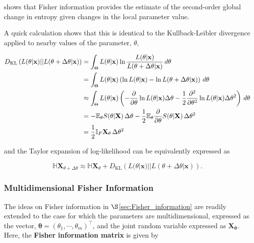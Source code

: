 \documentclass[12pt, twoside, draft]{article}
\begin{document}
shows that Fisher information provides the estimate of the second-order global change in entropy given changes in the local parameter value.

A quick calculation shows that this is identical to the Kullback-Leibler divergence applied to nearby values of the parameter, $\theta$,

\begin{align}
D_{\text{KL}} \left( L(\theta | \mathbf{x}) || L(\theta + \Delta \theta | \mathbf{x}) \right) &= \int_{\Theta}  L(\theta | \mathbf{x}) \ln \frac{L(\theta | \mathbf{x})}{ L(\theta + \Delta \theta | \mathbf{x})}\,d\theta \notag \\
&= \int_{\Theta} L(\theta | \mathbf{x}) \left( \ln L(\theta | \mathbf{x}) - \ln L(\theta + \Delta \theta | \mathbf{x}) \right)\,d\theta \notag \\
&\approx \int_{\Theta} L(\theta | \mathbf{x}) \left( -\frac{\partial}{\partial \theta} \ln L(\theta | \mathbf{x}) \Delta\theta - \frac{1}{2} \frac{\partial^2}{\partial \theta^2} \ln L(\theta | \mathbf{x}) \Delta\theta^2 \right)\,d\theta \notag \\
&= -\mathbb{E}_\theta S(\theta | \mathbf{X})\, \Delta \theta - \frac{1}{2}\mathbb{E}_\theta \frac{\partial}{\partial \theta} S(\theta | \mathbf{X})\, \Delta \theta^2 \notag \\
&= \frac{1}{2} \mathbb{I}_F \mathbf{X}_\theta\, \Delta \theta^2
\end{align}

and the Taylor expansion of log-likelihood can be equivalently expressed as

\begin{equation}
\mathbb{H} \mathbf{X}_{\theta + \Delta \theta} \approx \mathbb{H} \mathbf{X}_\theta + D_{\text{KL}} \left( L(\theta | \mathbf{x}) || L(\theta + \Delta \theta | \mathbf{x}) \right) .
\end{equation}

\subsubsection{Multidimensional Fisher Information}\label{sec:multidimensional_Fisher_information}

The ideas on Fisher information in $\S$\ref{sec:Fisher_information} are readily extended to the case for which the parameters are multidimensional, expressed as the vector, $\boldsymbol{\theta} = (\theta_1, \cdots, \theta_m)^\top$, and the joint random variable expressed as $\mathbf{X}_{\boldsymbol{\theta}}$.  Here, the \textbf{Fisher information matrix} is given by
\end{document}
